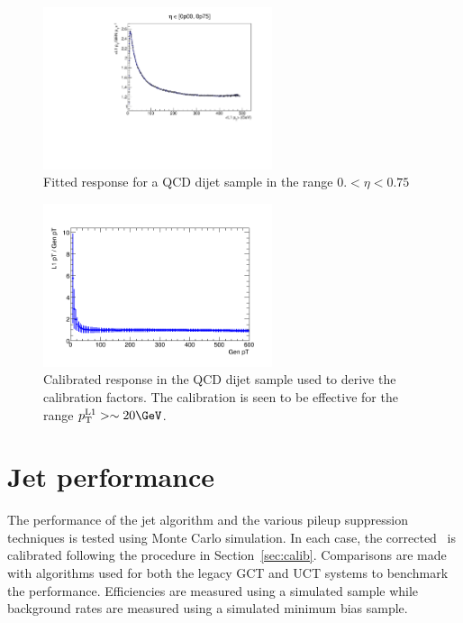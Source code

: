 \begin{figure}
\centering
    \includegraphics[width=0.6\textwidth]{./Figures/triggerUpgrade/calibrationSeed5Chunky}
  \caption{
  Fitted response for a QCD dijet sample in the range $0. < \eta < 0.75$ }
  \label{fig:response}
\end{figure}

\begin{figure}
\centering
    \includegraphics[width=0.6\textwidth]{./Figures/triggerUpgrade/calib_s5_chunky}
  \caption{Calibrated response in the QCD dijet sample used to derive the calibration factors. The calibration is seen to be 
  effective for the range $\Lonept > \sim 20\GeV$.}
  \label{fig:closure_response}
\end{figure}

\section{Jet performance}
\label{sec:trig_perf}
The performance of the jet algorithm and the various pileup suppression techniques is tested using
Monte Carlo simulation. In each case, the corrected \Lonept~is calibrated following the procedure in Section~\ref{sec:calib}.
Comparisons are made with algorithms used for both the legacy GCT and UCT systems to benchmark the performance.
Efficiencies are measured using a simulated \ttbar sample while 
background rates are measured using a simulated minimum bias sample.

